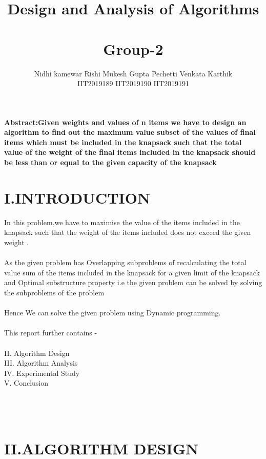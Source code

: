 \documentclass[twocolumn]{article}
\title{\vspace{-2cm} \textbf{{\myfont Design and Analysis of Algorithms}} \\
\\Group-2
}
\author{Nidhi kamewar   \hspace{10ex}Rishi Mukesh Gupta \hspace{6ex}   Pechetti Venkata Karthik\\    
\hspace{4ex}  IIT2019189     \hspace{14ex}           IIT2019190       \hspace{18ex}           IIT2019191   \hspace{9ex}  
   


}
\begin{document}
\maketitle
\noindent
\textbf{
Abstract:Given weights and values of n items we have to design an algorithm to find out the maximum value subset of the values of final items which must be included in the knapsack such that the total value of the weight of the final items included in the knapsack should be less than or equal to  the given capacity of the knapsack}

\section*{I.INTRODUCTION}

In this problem,we have to maximise the value of the items included in the knapsack such that the weight of the items included does not exceed the given weight .\\
\\
As the given problem has Overlapping subproblems of recalculating the total value sum of the items included in the knapsack for a given limit of the knapsack and Optimal substructure property i.e the given problem can be solved by  solving the subproblems of the problem
\\
\\
Hence We can solve the given problem using Dynamic programming.
\\
\noindent\\
This report further contains -\\
\\
II. Algorithm Design \\
III. Algorithm Analysis\\
IV. Experimental Study\\
V. Conclusion\\
\\
\\
\\
\section*{II.ALGORITHM DESIGN
}
\end{document}
